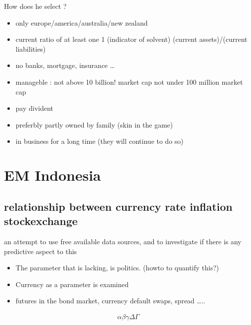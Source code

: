 \documentclass[letterpaper,10pt,english]{sphinxmanual}
\begin{document}
\sphinxAtStartPar
How does he select ?
\begin{itemize}
\item {} 
\sphinxAtStartPar
only europe/america/australia/new zealand

\item {} 
\sphinxAtStartPar
current ratio of at least one 1 (indicator of solvent)
(current assets)/(current liabilities)

\item {} 
\sphinxAtStartPar
no banks, mortgage, insurance …

\item {} 
\sphinxAtStartPar
manageble : not above 10 billion! market cap
not under 100 million market cap

\item {} 
\sphinxAtStartPar
pay divident

\item {} 
\sphinxAtStartPar
preferbly partly owned by family (skin in the game)

\item {} 
\sphinxAtStartPar
in business for a long time (they will continue to do so)

\end{itemize}

\sphinxstepscope


\chapter{EM Indonesia}
\label{\detokenize{indonesia:em-indonesia}}\label{\detokenize{indonesia::doc}}

\section{relationship between currency rate \sphinxhyphen{} inflation \sphinxhyphen{} stockexchange}
\label{\detokenize{indonesia:relationship-between-currency-rate-inflation-stockexchange}}
\sphinxAtStartPar
an attempt to use free available data sources, and to investigate if
there is any predictive aspect to this
\begin{itemize}
\item {} 
\sphinxAtStartPar
The parameter that is lacking, is politics. (howto to quantify this?)

\item {} 
\sphinxAtStartPar
Currency as a parameter is examined

\item {} 
\sphinxAtStartPar
futures in the bond market, currency default swaps, spread …..

\end{itemize}
\begin{equation*}
\begin{split}\alpha\beta\gamma\Delta\Gamma\end{split}
\end{equation*}
\begin{sphinxVerbatim}[commandchars=\\\{\}]
\end{sphinxVerbatim}
\end{document}
